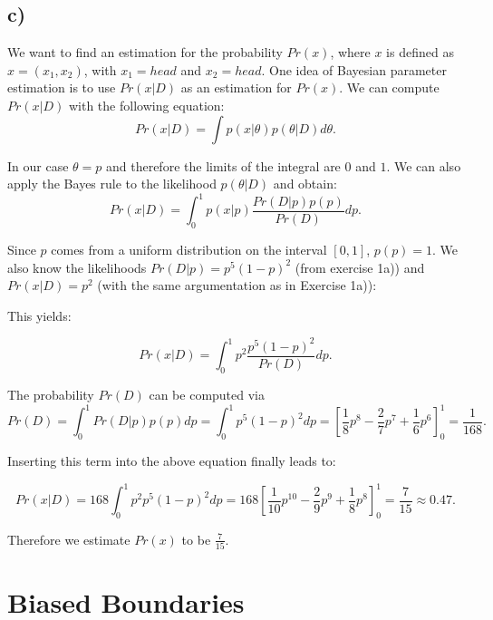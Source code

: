 \documentclass[paper=a4,fontsize=10pt,DIV11,BCOR10mm]{scrartcl}
\begin{document}
\subsection*{c)}
We want to find an estimation for the probability $Pr(x)$, where $x$ is defined as $x=(x_1,x_2)$, with $x_1=head$ and $x_2=head$. One idea of Bayesian parameter estimation is to use $Pr(x|D)$ as an estimation for $Pr(x)$.
We can compute $Pr(x|D)$ with the following equation:
\begin{equation*}
Pr(x|D)=\int p(x|\theta)p(\theta|D)d\theta\text{.}
\end{equation*}

In our case $\theta=p$ and therefore the limits of the integral are $0$ and $1$. We can also apply the Bayes rule to the likelihood $p(\theta|D)$ and obtain:
\begin{equation*}
Pr(x|D)=\int _0^1 p(x|p) \frac{Pr(D|p)p(p)}{Pr(D)} dp  \text{.}
\end{equation*}

Since $p$ comes from a uniform distribution on the interval $[0,1]$, $p(p)=1$. We also know the likelihoods $Pr(D|p)=p^5(1-p)^2$ (from exercise 1a)) and $Pr(x|D)=p^2$ (with the same argumentation as in Exercise 1a)):

This yields:

\begin{equation*}
Pr(x|D)=\int _0^1 p^2 \frac{p^5(1-p)^2}{Pr(D)} dp  \text{.}
\end{equation*}

The probability $Pr(D)$ can be computed via 
\begin{equation*}
Pr(D)=\int_0^1 Pr(D|p) p(p)dp =\int_0^1 p^5(1-p)^2 dp= \left[ \frac{1}{8} p^8 - \frac{2}{7} p^7 +\frac{1}{6} p^6\right]_0^1 =\frac{1}{168}\text{.}
\end{equation*}

Inserting this term into the above equation finally leads to:

\begin{equation*}
Pr(x|D)=168 \int _0^1 p^2 p^5(1-p)^2 dp  =168 \left [  \frac{1}{10}p^{10} - \frac{2}{9}p^9 + \frac{1}{8}p^8 \right]_0^1= \frac{7}{15}\approx 0.47\text{.}
\end{equation*}

Therefore we estimate $Pr(x)$ to be $\frac{7}{15}$.

\section{Biased Boundaries}
\end{document}
